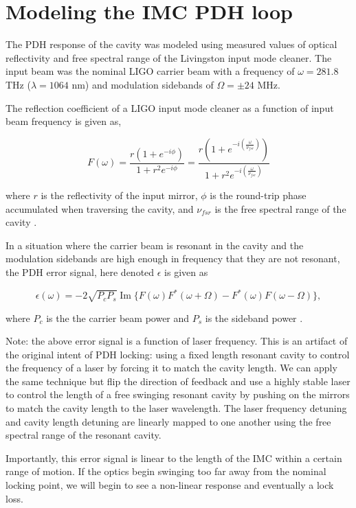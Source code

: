 \section{Modeling the IMC PDH loop}

The PDH response of the cavity was modeled using measured values of optical reflectivity and free spectral range of the Livingston input mode cleaner. The input beam was the nominal LIGO carrier beam with a frequency of $\omega = 281.8$ THz ($\lambda = 1064$ nm) and modulation sidebands of $\Omega = \pm24$ MHz.

The reflection coefficient of a LIGO input mode cleaner as a function of input beam frequency is given as,

\begin{equation}
F(\omega) = \frac{r(1 + e^{-i\phi})}{1+r^2e^{-i\phi}} = \frac{r(1 + e^{-i(\frac{\omega}{\nu_{fsr}})})}{1+r^2e^{-i(\frac{\omega}{\nu_{fsr}})}}
\end{equation}

where $r$ is the reflectivity of the input mirror, $\phi$ is the round-trip phase accumulated when traversing the cavity, and $\nu_{fsr}$ is the free spectral range of the cavity \cite{Mueller}.

In a situation where the carrier beam is resonant in the cavity and the modulation sidebands are high enough in frequency that they are not resonant, the PDH error signal, here denoted $\epsilon$ is given as

\begin{equation}
\epsilon(\omega) = -2\sqrt{P_{c}P_{s}}\operatorname{Im}\{F(\omega)F^*(\omega + \Omega) - F^*(\omega)F(\omega - \Omega)\},
\end{equation}

where $P_{c}$ is the the carrier beam power and $P_{s}$ is the sideband power \cite{Black01}.

Note: the above error signal is a function of laser frequency. This is an artifact of the original intent of PDH locking: using a fixed length resonant cavity to control the frequency of a laser by forcing it to match the cavity length. We can apply the same technique but flip the direction of feedback and use a highly stable laser to control the length of a free swinging resonant cavity by pushing on the mirrors to match the cavity length to the laser wavelength. The laser frequency detuning and cavity length detuning are linearly mapped to one another using the free spectral range of the resonant cavity.

Importantly, this error signal is linear to the length of the IMC within a certain range of motion. If the optics begin swinging too far away from the nominal locking point, we will begin to see a non-linear response and eventually a lock loss.

